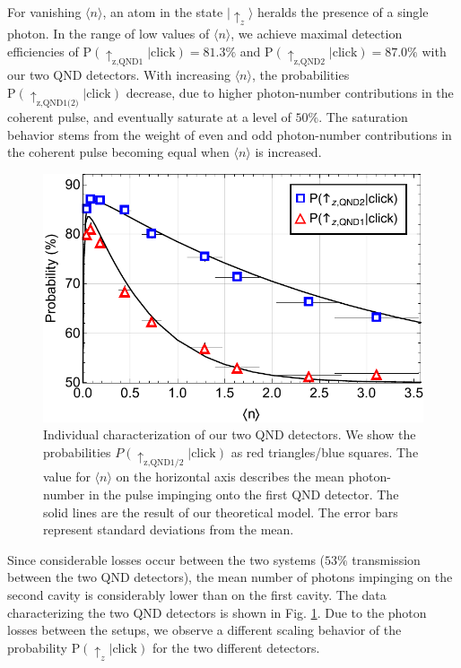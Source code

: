 \documentclass[prl,twocolumn,amsmath,amssymb,bibnotes,aps,longbibliography]{revtex4-1}
\newcommand{\ket}[1]{|{#1}\rangle}
\newcommand{\braket}[1]{\langle{#1}\rangle}
\begin{document}
For vanishing $\braket{n}$, an atom in the state $\ket{\uparrow_z}$ heralds the presence of a single photon. In the range of low values of $\braket{n}$, we achieve maximal detection efficiencies of $\text{P}(\uparrow_{\text{z,QND1}}\vert\text{click})=81.3\%$ and $\text{P}(\uparrow_{\text{z,QND2}}\vert\text{click})=87.0\%$ with our two QND detectors. With increasing $\braket{n}$, the probabilities $\text{P}(\uparrow_{\text{z,QND1(2)}}\vert\text{click})$ decrease, due to higher photon-number contributions in the coherent pulse, and eventually saturate at a level of $50\%$. The saturation behavior stems from the weight of even and odd photon-number contributions in the coherent pulse becoming equal when $\braket{n}$ is increased.
\renewcommand{\thefigure}{S1}
\begin{figure}[b]
\centering
\includegraphics[width=\columnwidth]{FigS1.pdf} 
\caption{\label{fig:data1} Individual characterization of our two QND detectors. We show the probabilities $P(\uparrow_{\text{z,QND1/2}}\vert\text{click})$ as red triangles/blue squares. The value for $\braket{n}$ on the horizontal axis describes the mean photon-number in the pulse impinging onto the first QND detector. The solid lines are the result of our theoretical model. The error bars represent standard deviations from the mean.}
\end{figure}
Since considerable losses occur between the two systems ($53\%$ transmission between the two QND detectors), the mean number of photons impinging on the second cavity is considerably lower than on the first cavity. The data characterizing the two QND detectors is shown in Fig. \ref{fig:data1}. Due to the photon losses between the setups, we observe a different scaling behavior of the probability $\text{P}(\uparrow_z\vert \text{click})$ for the two different detectors.
\end{document}
